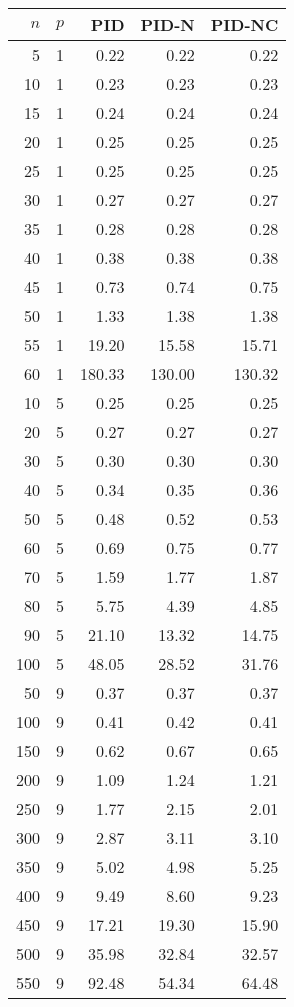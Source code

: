 \begin{tabular}{rrrrr}
\toprule
$n$ & $p$ & PID & PID-N & PID-NC \\
\midrule
5  & 1  & 0.22  & 0.22  & 0.22 \\
10  & 1  & 0.23  & 0.23  & 0.23 \\
15  & 1  & 0.24  & 0.24  & 0.24 \\
20  & 1  & 0.25  & 0.25  & 0.25 \\
25  & 1  & 0.25  & 0.25  & 0.25 \\
30  & 1  & 0.27  & 0.27  & 0.27 \\
35  & 1  & 0.28  & 0.28  & 0.28 \\
40  & 1  & 0.38  & 0.38  & 0.38 \\
45  & 1  & 0.73  & 0.74  & 0.75 \\
50  & 1  & 1.33  & 1.38  & 1.38 \\
55  & 1  & 19.20  & 15.58  & 15.71 \\
60  & 1  & 180.33  & 130.00  & 130.32 \\
10  & 5  & 0.25  & 0.25  & 0.25 \\
20  & 5  & 0.27  & 0.27  & 0.27 \\
30  & 5  & 0.30  & 0.30  & 0.30 \\
40  & 5  & 0.34  & 0.35  & 0.36 \\
50  & 5  & 0.48  & 0.52  & 0.53 \\
60  & 5  & 0.69  & 0.75  & 0.77 \\
70  & 5  & 1.59  & 1.77  & 1.87 \\
80  & 5  & 5.75  & 4.39  & 4.85 \\
90  & 5  & 21.10  & 13.32  & 14.75 \\
100  & 5  & 48.05  & 28.52  & 31.76 \\
50  & 9  & 0.37  & 0.37  & 0.37 \\
100  & 9  & 0.41  & 0.42  & 0.41 \\
150  & 9  & 0.62  & 0.67  & 0.65 \\
200  & 9  & 1.09  & 1.24  & 1.21 \\
250  & 9  & 1.77  & 2.15  & 2.01 \\
300  & 9  & 2.87  & 3.11  & 3.10 \\
350  & 9  & 5.02  & 4.98  & 5.25 \\
400  & 9  & 9.49  & 8.60  & 9.23 \\
450  & 9  & 17.21  & 19.30  & 15.90 \\
500  & 9  & 35.98  & 32.84  & 32.57 \\
550  & 9  & 92.48  & 54.34  & 64.48 \\
\bottomrule
\end{tabular}
